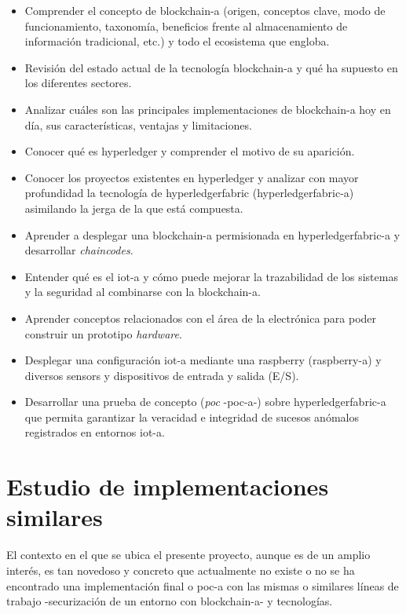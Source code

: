 \documentclass[12pt,a4paper, twoside]{report}
\begin{document}
	\begin{itemize}
		\item Comprender el concepto de \gls{blockchain-a} (origen, conceptos clave, modo de funcionamiento, taxonomía, beneficios frente al almacenamiento de información tradicional, etc.) y todo el ecosistema que engloba. 
		\item Revisión del estado actual de la tecnología \gls{blockchain-a} y qué ha supuesto en los diferentes sectores.
		\item Analizar cuáles son las principales implementaciones de \gls{blockchain-a} hoy en día, sus características, ventajas y limitaciones.
		\item Conocer qué es \gls{hyperledger} y comprender el motivo de su aparición. 
		\item Conocer los proyectos existentes en \gls{hyperledger} y analizar con mayor profundidad la tecnología de \gls{hyperledgerfabric} (\gls{hyperledgerfabric-a}) asimilando la jerga de la que está compuesta. 
		\item Aprender a desplegar una \gls{blockchain-a} permisionada en \gls{hyperledgerfabric-a} y desarrollar \textit{\glspl{chaincode}}.
		\item Entender qué es el \gls{iot-a} y cómo puede mejorar la trazabilidad de los sistemas y la seguridad al combinarse con la \gls{blockchain-a}.
		\item Aprender conceptos relacionados con el área de la electrónica para poder construir un \gls{prototipo} \textit{hardware}.
		\item Desplegar una configuración \gls{iot-a} mediante una \gls{raspberry} (\gls{raspberry-a}) y diversos \glspl{sensor} y dispositivos de entrada y salida (E/S).
		\item Desarrollar una prueba de concepto (\textit{\gls{poc}} -\gls{poc-a}-) sobre \gls{hyperledgerfabric-a} que permita garantizar la veracidad e integridad de sucesos anómalos registrados en entornos \gls{iot-a}.
	\end{itemize}
		
	\section{Estudio de implementaciones similares}
	
	El contexto en el que se ubica el presente proyecto, aunque es de un amplio interés, es tan novedoso y concreto que actualmente no existe o no se ha encontrado una implementación final o \gls{poc-a} con las mismas o similares líneas de trabajo -securización de un entorno con \gls{blockchain-a}- y tecnologías. \\
	
\end{document}
